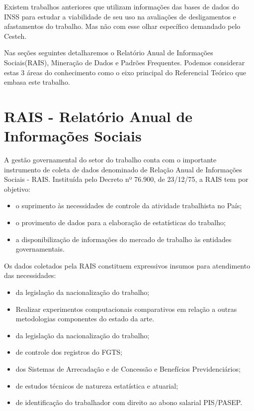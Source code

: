 \documentclass[12pt]{article}
\begin{document}
Existem trabalhos anteriores que utilizam informações das bases de dados do INSS para estudar a viabilidade de seu uso na avaliações de desligamentos e afastamentos do trabalho. \cite{Boff2002}
Mas não com esse olhar específico demandado pelo Cesteh.\cite{veras2000afastamentos}

Nas seções seguintes detalharemos o Relatório Anual de Informações Sociais(RAIS), Mineração de Dados e Padrões Frequentes. Podemos  considerar estas 3 áreas do conhecimento como o eixo principal do Referencial Teórico que embasa este trabalho.

\section{RAIS - Relatório Anual de Informações Sociais}

A gestão governamental do setor do trabalho conta com o importante instrumento de coleta de dados denominado de Relação Anual de Informações Sociais - RAIS. Instituída pelo Decreto nº 76.900, de 23/12/75, a RAIS tem por objetivo:
\begin{itemize}
    \item o suprimento às necessidades de controle da atividade trabalhista no País;
    \item o provimento de dados para a elaboração de estatísticas do trabalho;
    \item a disponibilização de informações do mercado de trabalho às entidades governamentais.
\end{itemize}

Os dados coletados pela RAIS constituem expressivos insumos para atendimento das necessidades:
\begin{itemize}
    \item da legislação da nacionalização do trabalho;
    \item Realizar experimentos computacionais comparativos em relação a outras metodologias componentes do estado da arte.  
    \item da legislação da nacionalização do trabalho;
    \item de controle dos registros do FGTS;
    \item dos Sistemas de Arrecadação e de Concessão e Benefícios Previdenciários;
    \item de estudos técnicos de natureza estatística e atuarial;
    \item de identificação do trabalhador com direito ao abono salarial PIS/PASEP.
\end{itemize}
\end{document}
